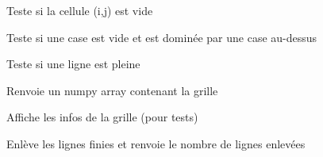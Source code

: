 \documentclass[letterpaper,10pt,french]{sphinxmanual}
\begin{document}
\begin{fulllineitems}
\begin{fulllineitems}
\end{fulllineitems}


\begin{fulllineitems}
\label{\detokenize{index:board.Board.isCellEmpty}}
Teste si la cellule (i,j) est vide

\end{fulllineitems}


\begin{fulllineitems}
\label{\detokenize{index:board.Board.isDominated}}
Teste si une case est vide et est dominée par une case au-dessus

\end{fulllineitems}


\begin{fulllineitems}
\label{\detokenize{index:board.Board.isLineFull}}
Teste si une ligne est pleine

\end{fulllineitems}


\begin{fulllineitems}
\label{\detokenize{index:board.Board.npBinaryRepresentation}}
Renvoie un numpy array contenant la grille

\end{fulllineitems}


\begin{fulllineitems}
\label{\detokenize{index:board.Board.printInfos}}
Affiche les infos de la grille (pour tests)

\end{fulllineitems}


\begin{fulllineitems}
\label{\detokenize{index:board.Board.processLines}}
Enlève les lignes finies et renvoie le nombre de lignes enlevées


\end{fulllineitems}
\end{fulllineitems}
\end{document}
